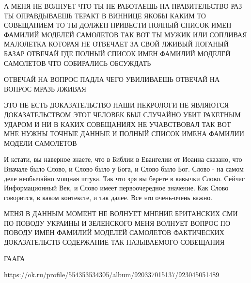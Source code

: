 А МЕНЯ НЕ ВОЛНУЕТ ЧТО ТЫ НЕ РАБОТАЕШЬ НА ПРАВИТЕЛЬСТВО РАЗ ТЫ ОПРАВДЫВАЕШЬ
ТЕРАКТ В ВИННИЦЕ ЯКОБЫ КАКИМ ТО СОВЕЩАНИЕМ ТО ТЫ ДОЛЖЕН ПРИВЕСТИ ПОЛНЫЙ СПИСОК
ИМЕН ФАМИЛИЙ МОДЕЛЕЙ САМОЛЕТОВ ТАК ВОТ ТЫ МУЖИК ИЛИ СОПЛИВАЯ МАЛОЛЕТКА КОТОРАЯ
НЕ ОТВЕЧАЕТ ЗА СВОЙ ЛЖИВЫЙ ПОГАНЫЙ БАЗАР ОТВЕЧАЙ ГДЕ ПОЛНЫЙ СПИСОК ИМЕН ФАМИЛИЙ
МОДЕЛЕЙ САМОЛЕТОВ ЧТО СОБИРАЛИСЬ ОБСУЖДАТЬ

ОТВЕЧАЙ НА ВОПРОС ПАДЛА ЧЕГО УВИЛИВАЕШЬ ОТВЕЧАЙ НА ВОПРОС МРАЗЬ ЛЖИВАЯ

ЭТО НЕ ЕСТЬ ДОКАЗАТЕЛЬСТВО НАШИ НЕКРОЛОГИ НЕ ЯВЛЯЮТСЯ ДОКАЗАТЕЛЬСТВОМ ЭТОТ
ЧЕЛОВЕК БЫЛ СЛУЧАЙНО УБИТ РАКЕТНЫМ УДАРОМ И НИ В КАКИХ СОВЕЩАНИЯХ НЕ
УЧАВСТВОВАЛ ТАК ВОТ МНЕ НУЖНЫ ТОЧНЫЕ ДАННЫЕ И ПОЛНЫЙ СПИСОК ИМЕНА ФАМИЛИИ
МОДЕЛИ САМОЛЕТОВ


И кстати, вы наверное знаете, что в Библии в Евангелии от Иоанна сказано, что
Вначале было Слово, и Слово было у Бога, и Слово было Бог. Слово - на самом
деле необычайно мощная штука. Так что зря вы берете в кавычки Слово. Сейчас
Информационный Век, и Слово имеет первоочередное значение. Как Слово говорится,
в каком контексте, и так далее. Все это очень-очень важно.


МЕНЯ В ДАННЫМ МОМЕНТ НЕ ВОЛНУЕТ МНЕНИЕ БРИТАНСКИХ СМИ ПО ПОВОДУ УКРАИНЫ И
ЗЕЛЕНСКОГО МЕНЯ ВОЛНУЕТ ВОПРОС ПО ПОВОДУ ИМЕН ФАМИЛИЙ МОДЕЛЕЙ САМОЛЕТОВ
ФАКТИЧЕСКИХ ДОКАЗАТЕЛЬСТВ СОДЕРЖАНИЕ ТАК НАЗЫВАЕМОГО СОВЕЩАНИЯ

ГААГА

https://ok.ru/profile/554353534305/album/920337015137/923045051489

